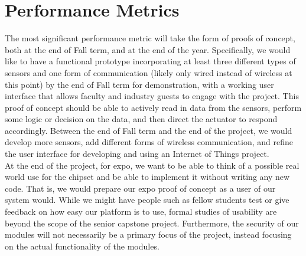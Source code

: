\documentclass[onecolumn, draftclsnofoot,10pt, compsoc]{IEEEtran}
\begin{document}
\section{Performance Metrics}
    The most significant performance metric will take the form of proofs of concept, both at the end of Fall term, and at the end of the year. Specifically, we would like to have a functional prototype incorporating at least three different types of sensors and one form of communication (likely only wired instead of wireless at this point) by the end of Fall term for demonstration, with a working user interface that allows faculty and industry guests to engage with the project. This proof of concept should be able to actively read in data from the sensors, perform some logic or decision on the data, and then direct the actuator to respond accordingly. Between the end of Fall term and the end of the project, we would develop more sensors, add different forms of wireless communication, and refine the user interface for developing and using an Internet of Things project. \\
    At the end of the project, for expo, we want to be able to think of a possible real world use for the chipset and be able to implement it without writing any new code. That is, we would prepare our expo proof of concept as a user of our system would. While we might have people such as fellow students test or give feedback on how easy our platform is to use, formal studies of usability are beyond the scope of the senior capstone project. Furthermore, the security of our modules will not necessarily be a primary focus of the project, instead focusing on the actual functionality of the modules.
\end{document}
